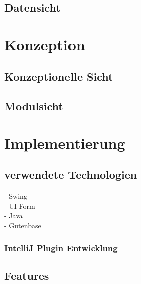 \subsection{Datensicht}
\section{Konzeption}

\subsection{Konzeptionelle Sicht}
\subsection{Modulsicht}



\section{Implementierung}
\subsection{verwendete Technologien}
- Swing \\
- UI Form \\
- Java\\
- Gutenbase
\subsubsection{IntelliJ Plugin Entwicklung}

\subsection{Features}


